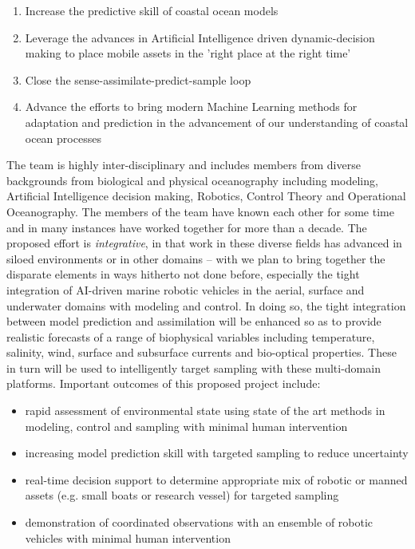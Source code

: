 \begin{enumerate}

\item Increase the predictive skill of coastal ocean models

\item Leverage the advances in Artificial Intelligence driven
  dynamic-decision making to place mobile assets in the 'right place
  at the right time'

\item Close the sense-assimilate-predict-sample loop
  
\item Advance the efforts to bring modern Machine Learning methods for
  adaptation and prediction in the advancement of our understanding of
  coastal ocean processes
  
\end{enumerate}


The \proj team is highly inter-disciplinary and includes members from
diverse backgrounds from biological and physical oceanography
including modeling, Artificial Intelligence decision making, Robotics,
Control Theory and Operational Oceanography. The members of the team
have known each other for some time and in many instances have worked
together for more than a decade.  The proposed effort is
\emph{integrative}, in that work in these diverse fields has advanced
in siloed environments or in other domains -- with \proj we plan to
bring together the disparate elements in ways hitherto not done
before, especially the tight integration of AI-driven marine robotic
vehicles in the aerial, surface and underwater domains with modeling
and control. In doing so, the tight integration between model
prediction and assimilation will be enhanced so as to provide
realistic forecasts of a range of biophysical variables including
temperature, salinity, wind, surface and subsurface currents and
bio-optical properties. These in turn will be used to intelligently
target sampling with these multi-domain platforms. Important outcomes
of this proposed project include:

\begin{itemize}

\item rapid assessment of environmental state using state of the art
  methods in modeling, control and sampling with minimal human
  intervention
  
\item increasing model prediction skill with targeted sampling to reduce
  uncertainty
  
\item real-time decision support to determine appropriate mix of robotic
  or manned assets (e.g. small boats or research vessel) for targeted
  sampling
  
\item demonstration of coordinated observations with an ensemble of
  robotic vehicles with minimal human intervention

\end{itemize}  

